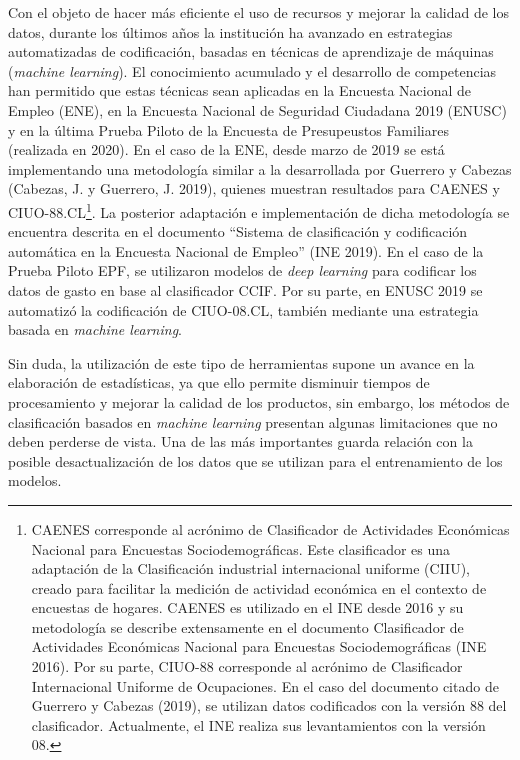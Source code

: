 \documentclass[
  12pt,
  spanish,
]{article}
\begin{document}
Con el objeto de hacer más eficiente el uso de recursos y mejorar la
calidad de los datos, durante los últimos años la institución ha
avanzado en estrategias automatizadas de codificación, basadas en
técnicas de aprendizaje de máquinas (\emph{machine learning}). El
conocimiento acumulado y el desarrollo de competencias han permitido que
estas técnicas sean aplicadas en la Encuesta Nacional de Empleo (ENE),
en la Encuesta Nacional de Seguridad Ciudadana 2019 (ENUSC) y en la
última Prueba Piloto de la Encuesta de Presupeustos Familiares
(realizada en 2020). En el caso de la ENE, desde marzo de 2019 se está
implementando una metodología similar a la desarrollada por Guerrero y
Cabezas (Cabezas, J. y Guerrero, J. 2019), quienes muestran resultados
para CAENES y CIUO-88.CL\footnote{CAENES corresponde al acrónimo de
  Clasificador de Actividades Económicas Nacional para Encuestas
  Sociodemográficas. Este clasificador es una adaptación de la
  Clasificación industrial internacional uniforme (CIIU), creado para
  facilitar la medición de actividad económica en el contexto de
  encuestas de hogares. CAENES es utilizado en el INE desde 2016 y su
  metodología se describe extensamente en el documento Clasificador de
  Actividades Económicas Nacional para Encuestas Sociodemográficas (INE
  2016). Por su parte, CIUO-88 corresponde al acrónimo de Clasificador
  Internacional Uniforme de Ocupaciones. En el caso del documento citado
  de Guerrero y Cabezas (2019), se utilizan datos codificados con la
  versión 88 del clasificador. Actualmente, el INE realiza sus
  levantamientos con la versión 08.}. La posterior adaptación e
implementación de dicha metodología se encuentra descrita en el
documento ``Sistema de clasificación y codificación automática en la
Encuesta Nacional de Empleo'' (INE 2019). En el caso de la Prueba Piloto
EPF, se utilizaron modelos de \emph{deep learning} para codificar los
datos de gasto en base al clasificador CCIF. Por su parte, en ENUSC 2019
se automatizó la codificación de CIUO-08.CL, también mediante una
estrategia basada en \emph{machine learning}.

Sin duda, la utilización de este tipo de herramientas supone un avance
en la elaboración de estadísticas, ya que ello permite disminuir tiempos
de procesamiento y mejorar la calidad de los productos, sin embargo, los
métodos de clasificación basados en \emph{machine learning} presentan
algunas limitaciones que no deben perderse de vista. Una de las más
importantes guarda relación con la posible desactualización de los datos
que se utilizan para el entrenamiento de los modelos.
\end{document}
